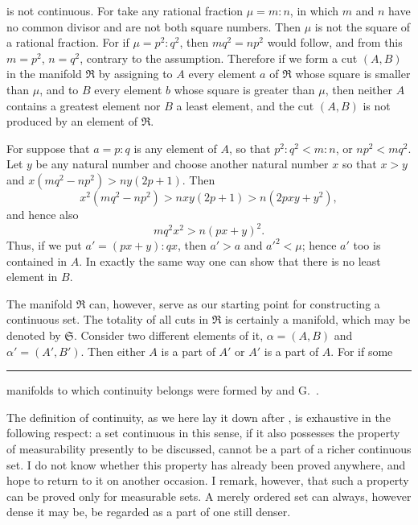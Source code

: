 is not continuous. For take any rational fraction $\mu=m:n$, in which
$m$ and $n$ have no common divisor and are not both square numbers.
Then $\mu$ is not the square of a rational fraction. For if
$\mu=p^2:q^2$, then $mq^2=np^2$ would follow, and from this $m=p^2$,
$n=q^2$, contrary to the assumption. Therefore if we form a cut
$(A,B)$ in the manifold $\mathfrak R$ by assigning to $A$ every
element $a$ of $\mathfrak R$ whose square is smaller than $\mu$, and
to $B$ every element $b$ whose square is greater than $\mu$, then
neither $A$ contains a greatest element nor $B$ a least element, and
the cut $(A,B)$ is not produced by an element of $\mathfrak R$.

For suppose that $a=p:q$ is any element of $A$, so that
$p^2:q^2<m:n$, or $np^2<mq^2$. Let $y$ be any natural number and
choose another natural number $x$ so that $x>y$ and
$x(mq^2-np^2)>ny(2p+1)$. Then
\[
 x^2(mq^2-np^2)>nxy(2p+1)>n(2pxy+y^2),
\]
and hence also
\[
 mq^2x^2>n(px+y)^2.
\]
Thus, if we put $a'=(px+y):qx$, then $a'>a$ and $a'^2<\mu$;
hence $a'$ too is contained in $A$. In exactly the same way one can
show that there is no least element in $B$.

The manifold $\mathfrak R$ can, however, serve as our starting point
for constructing a continuous set. The totality of all cuts in
$\mathfrak R$ is certainly a manifold, which may be denoted by
$\mathfrak S$. Consider two different elements of it,
$\alpha=(A,B)$ and $\alpha'=(A',B')$. Then either $A$ is a part of
$A'$ or $A'$ is a part of $A$. For if some

\par\vfill
\noindent\rule{0.22\linewidth}{0.4pt}

{\footnotesize\noindent
manifolds to which continuity belongs were formed by
 and G.\ .

The definition of continuity, as we here lay it down after
, is exhaustive in the following respect: a set
continuous in this sense, if it also possesses the property of
measurability presently to be discussed, cannot be a part of a richer
continuous set. I do not know whether this property has already been
proved anywhere, and hope to return to it on another occasion. I
remark, however, that such a property can be proved only for measurable
sets. A merely ordered set can always, however dense it may be, be
regarded as a part of one still denser.}
